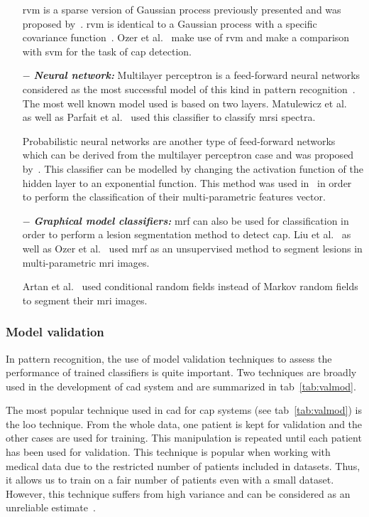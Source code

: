 \begin{enumerate}[leftmargin=*]
  \Acf{rvm} is a sparse version of Gaussian process previously presented and was proposed by~\cite{Tipping2001}. \ac{rvm} is identical to a Gaussian process with a specific covariance function~\cite{Quinonero-Candela2002}. Ozer et al.~\cite{Ozer2009,Ozer2010} make use of \ac{rvm} and make a comparison with \ac{svm} for the task of \ac{cap} detection.

\item[$-$] \textbf{\textit{Neural network:}} Multilayer perceptron is a feed-forward neural networks considered as the most successful model of this kind in pattern recognition~\cite{Bishop2006}. The most well known model used is based on two layers. Matulewicz et al.~\cite{Matulewicz2013} as well as Parfait et al.~\cite{Parfait2012} used this classifier to classify \ac{mrsi} spectra.

  Probabilistic neural networks are another type of feed-forward networks which can be derived from the multilayer perceptron case and was proposed by~\cite{Specht1988}. This classifier can be modelled by changing the activation function of the hidden layer to an exponential function. This method was used  in~\cite{Ampeliotis2007,Ampeliotis2008,Viswanath2011} in order to perform the classification of their multi-parametric features vector.

\item[$-$] \textbf{\textit{Graphical model classifiers:}} \ac{mrf} can also be used for classification in order to perform a lesion segmentation method to detect \ac{cap}. Liu et al.~\cite{Liu2009} as well as Ozer et al.~\cite{Ozer2010} used \ac{mrf} as an unsupervised method to segment lesions in multi-parametric \ac{mri} images.

 Artan et al.~\cite{Artan2009,Artan2010} used conditional random fields instead of Markov random fields to segment their \ac{mri} images.
\end{enumerate}

\subsubsection{Model validation}

In pattern recognition, the use of model validation techniques to assess the performance of trained classifiers is quite important. Two techniques are broadly used in the development of \ac{cad} system and are summarized in \ac{tab}~\ref{tab:valmod}.

The most popular technique used in \ac{cad} for \ac{cap} systems (see \ac{tab}~\ref{tab:valmod}) is the \acf{loo} technique. From the whole data, one patient is kept for validation and the other cases are used for training. This manipulation is repeated until each patient has been used for validation. This technique is popular when working with medical data due to the restricted number of patients included in datasets. Thus, it allows us to train on a fair number of patients even with a small dataset. However, this technique suffers from high variance and can be considered as an unreliable estimate~\cite{Efron1983}.

